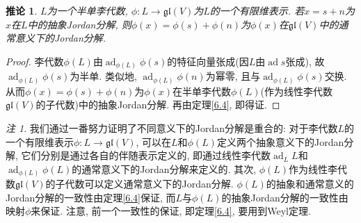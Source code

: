 \documentclass{ctexart}%
\newtheorem{corollary}{推论}
\theoremstyle{definition}
\theoremstyle{remark}
\newtheorem{remark}{注}
\DeclareMathOperator{\ad}{ad}
\begin{document}
\begin{corollary}\label{6.4c}
$L$为一个半单李代数, $\phi\colon L\rightarrow \mathfrak{gl}(V)$为$L$的一个有限维表示. 若$x=s+n$为$x$在$L$中的抽象Jordan分解, 则$\phi(x)=\phi(s)+\phi(n)$为$\phi(x)$在$\mathfrak{gl}(V)$中的通常意义下的Jordan分解.
\end{corollary}
\begin{proof}
李代数$\phi(L)$由$\ad_{\phi(L)} \phi(s)$的特征向量张成(因$L$由$\ad s$张成), 故$\ad_{\phi(L)}\phi(s)$为半单. 类似地, $\ad_{\phi(L)}\phi(n)$为幂零, 且与$\ad_{\phi(L)}\phi(s)$交换. 从而$\phi(x)=\phi(s)+\phi(n)$为$\phi(x)$在半单李代数$\phi(L)$(作为线性李代数$\mathfrak{gl}(V)$的子代数)中的抽象Jordan分解. 再由定理\ref{6.4}, 即得证.
\end{proof}
\begin{remark}
我们通过一番努力证明了不同意义下的Jordan分解是重合的: 对于李代数$L$的一个有限维表示$\phi\colon L\rightarrow \mathfrak{gl}(V)$, 可以在$L$和$\phi(L)$定义两个抽象意义下的Jordan分解, 它们分别是通过各自的伴随表示定义的, 即通过线性李代数$\ad_LL$和$\ad_{\phi(L)}\phi(L)$的通常意义下的Jordan分解来定义的. 其次, $\phi(L)$作为线性李代数$\mathfrak{gl}(V)$的子代数可以定义通常意义下的Jordan分解. $\phi(L)$的抽象和通常意义的Jordan分解的一致性由定理\ref{6.4}保证, 而$L$与$\phi(L)$的抽象Jordan分解的一致性由映射$\phi$来保证. 注意, 前一个一致性的保证, 即定理\ref{6.4}, 要用到Weyl定理. 
\end{remark}
\end{document}
